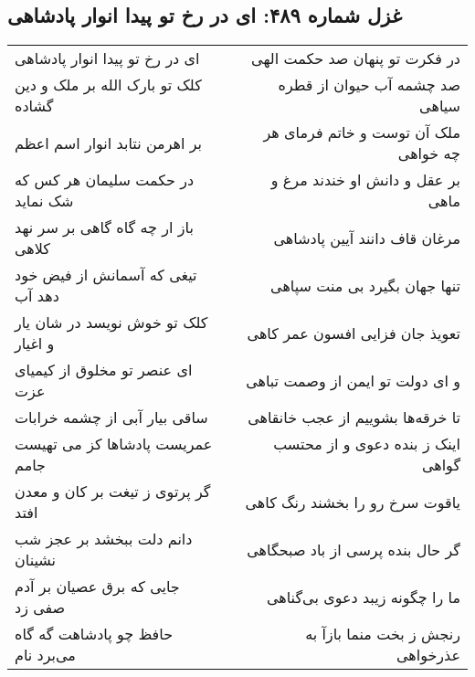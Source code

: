 \begin{center}
\section*{غزل شماره ۴۸۹: ای در رخ تو پیدا انوار پادشاهی}
\label{sec:sh489}
\begin{longtable}{l p{0.5cm} r}
ای در رخ تو پیدا انوار پادشاهی
&&
در فکرت تو پنهان صد حکمت الهی
\\
کلک تو بارک الله بر ملک و دین گشاده
&&
صد چشمه آب حیوان از قطره سیاهی
\\
بر اهرمن نتابد انوار اسم اعظم
&&
ملک آن توست و خاتم فرمای هر چه خواهی
\\
در حکمت سلیمان هر کس که شک نماید
&&
بر عقل و دانش او خندند مرغ و ماهی
\\
باز ار چه گاه گاهی بر سر نهد کلاهی
&&
مرغان قاف دانند آیین پادشاهی
\\
تیغی که آسمانش از فیض خود دهد آب
&&
تنها جهان بگیرد بی منت سپاهی
\\
کلک تو خوش نویسد در شان یار و اغیار
&&
تعویذ جان فزایی افسون عمر کاهی
\\
ای عنصر تو مخلوق از کیمیای عزت
&&
و ای دولت تو ایمن از وصمت تباهی
\\
ساقی بیار آبی از چشمه خرابات
&&
تا خرقه‌ها بشوییم از عجب خانقاهی
\\
عمریست پادشاها کز می تهیست جامم
&&
اینک ز بنده دعوی و از محتسب گواهی
\\
گر پرتوی ز تیغت بر کان و معدن افتد
&&
یاقوت سرخ رو را بخشند رنگ کاهی
\\
دانم دلت ببخشد بر عجز شب نشینان
&&
گر حال بنده پرسی از باد صبحگاهی
\\
جایی که برق عصیان بر آدم صفی زد
&&
ما را چگونه زیبد دعوی بی‌گناهی
\\
حافظ چو پادشاهت گه گاه می‌برد نام
&&
رنجش ز بخت منما بازآ به عذرخواهی
\\
\end{longtable}
\end{center}
